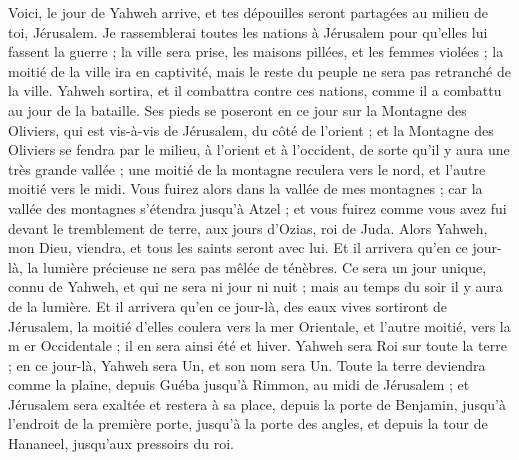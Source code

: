 \begin{multicols}{2}
\VerseOne{}Voici, le jour de Yahweh arrive, et tes dépouilles seront partagées au milieu de toi, Jérusalem.
Je rassemblerai toutes les nations à Jérusalem pour qu'elles lui fassent la guerre ; la ville sera prise, les maisons pillées, et les femmes violées ; la moitié de la ville ira en captivité, mais le reste du peuple ne sera pas retranché de la ville.
Yahweh sortira, et il combattra contre ces nations, comme il a combattu au jour de la bataille.
Ses pieds se poseront en ce jour sur la Montagne des Oliviers, qui est vis-à-vis de Jérusalem, du côté de l'orient ; et la Montagne des Oliviers se fendra par le milieu, à l'orient et à l'occident, de sorte qu'il y aura une très grande vallée ; une moitié de la montagne reculera vers le nord, et l'autre moitié vers le midi.
Vous fuirez alors dans la vallée de mes montagnes ; car la vallée des montagnes s'étendra jusqu'à Atzel ; et vous fuirez comme vous avez fui devant le tremblement de terre, aux jours d'Ozias, roi de Juda. Alors Yahweh, mon Dieu, viendra, et tous les saints seront avec lui.
Et il arrivera qu'en ce jour-là, la lumière précieuse ne sera pas mêlée de ténèbres.
Ce sera un jour unique, connu de Yahweh, et qui ne sera ni jour ni nuit ; mais au temps du soir il y aura de la lumière.
Et il arrivera qu'en ce jour-là, des eaux vives sortiront de Jérusalem, la moitié d'elles coulera vers la mer Orientale, et l'autre moitié, vers la m er Occidentale ; il en sera ainsi été et hiver.
Yahweh sera Roi sur toute la terre ; en ce jour-là, Yahweh sera Un, et son nom sera Un.
Toute la terre deviendra comme la plaine, depuis Guéba jusqu'à Rimmon, au midi de Jérusalem ; et Jérusalem sera exaltée et restera à sa place, depuis la porte de Benjamin, jusqu'à l'endroit de la première porte, jusqu'à la porte des angles, et depuis la tour de Hananeel, jusqu'aux pressoirs du roi.

\end{multicols}
